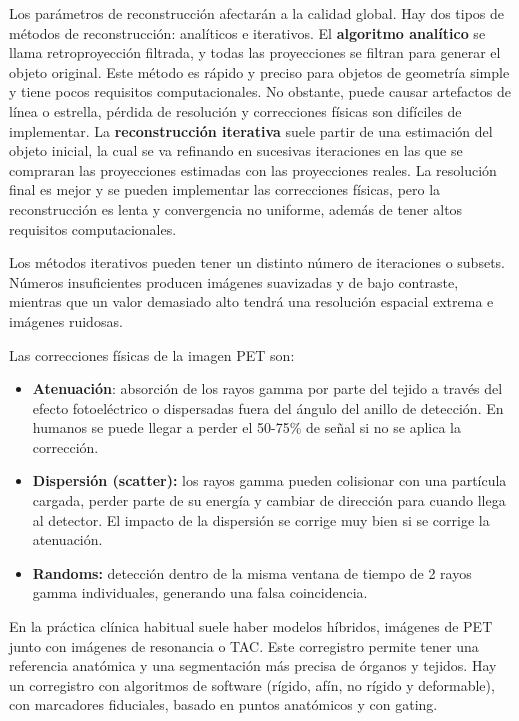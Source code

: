Los parámetros de reconstrucción afectarán a la calidad global. Hay dos tipos de métodos de reconstrucción: analíticos e iterativos. El \textbf{algoritmo analítico} se llama retroproyección filtrada, y todas las proyecciones se filtran para generar el objeto original. Este método es rápido y preciso para objetos de geometría simple y tiene pocos requisitos computacionales. No obstante, puede causar artefactos de línea o estrella, pérdida de resolución y correcciones físicas son difíciles de implementar. La \textbf{reconstrucción iterativa} suele partir de una estimación del objeto inicial, la cual se va refinando en sucesivas iteraciones en las que se compraran las proyecciones estimadas con las proyecciones reales. La resolución final es mejor y se pueden implementar las correcciones físicas, pero la reconstrucción es lenta y convergencia no uniforme, además de tener altos requisitos computacionales. 

Los métodos iterativos pueden tener un distinto número de iteraciones o subsets. Números insuficientes producen imágenes suavizadas y de bajo contraste, mientras que un valor demasiado alto tendrá una resolución espacial extrema e imágenes ruidosas.

Las correcciones físicas de la imagen PET son:
\begin{itemize}
\item \textbf{Atenuación}: absorción de los rayos gamma por parte del tejido a través del efecto fotoeléctrico o dispersadas fuera del ángulo del anillo de detección. En humanos se puede llegar a perder el 50-75\% de señal si no se aplica la corrección.
\item \textbf{Dispersión (scatter):} los rayos gamma pueden colisionar con una partícula cargada, perder parte de su energía y cambiar de dirección para cuando llega al detector. El impacto de la dispersión se corrige muy bien si se corrige la atenuación.
\item \textbf{Randoms:} detección dentro de la misma ventana de tiempo de 2 rayos gamma individuales, generando una falsa coincidencia.
\end{itemize}

En la práctica clínica habitual suele haber modelos híbridos, imágenes de PET junto con imágenes de resonancia o TAC. Este corregistro permite tener una referencia anatómica y una segmentación más precisa de órganos y tejidos.
Hay un corregistro con algoritmos de software (rígido, afín, no rígido y deformable), con marcadores fiduciales, basado en puntos anatómicos y con gating.

